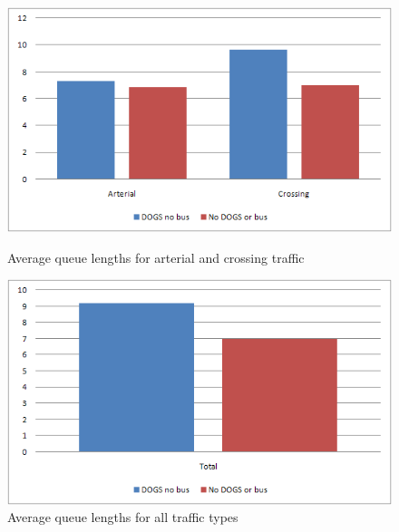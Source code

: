 \begin{figure}[ht]

    \begin{minipage}[b]{0.5\linewidth}

\begin{center}
\includegraphics[scale=0.30]{aveq.png} 
\end{center}
\caption{Average queue lengths for arterial and crossing traffic}
\label{fig:aveq}

    \end{minipage}
    \hspace{0.5cm}
    \begin{minipage}[b]{0.5\linewidth}

\begin{center}
\includegraphics[scale=0.30]{aveq_total.png} 
\end{center}
\caption{Average queue lengths for all traffic types}
\label{fig:aveq_tot}

    \end{minipage}

\end{figure}

